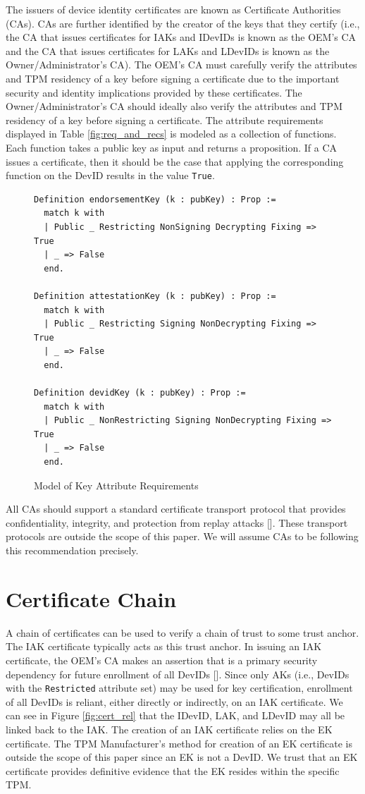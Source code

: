 The issuers of device identity certificates are known as Certificate Authorities (CAs). CAs are further identified by the creator of the keys that they certify (i.e., the CA that issues certificates for IAKs and IDevIDs is known as the OEM's CA and the CA that issues certificates for LAKs and LDevIDs is known as the Owner/Administrator's CA). The OEM's CA must carefully verify the attributes and TPM residency of a key before signing a certificate due to the important security and identity implications provided by these certificates. The Owner/Administrator's CA should ideally also verify the attributes and TPM residency of a key before signing a certificate. The attribute requirements displayed in Table \ref{fig:req_and_recs} is modeled as a collection of functions. Each function takes a public key as input and returns a proposition. If a CA issues a certificate, then it should be the case that applying the corresponding function on the DevID results in the value \verb|True|.
\begin{figure}[h]
\begin{lstlisting}[language=Coq]
Definition endorsementKey (k : pubKey) : Prop :=
  match k with
  | Public _ Restricting NonSigning Decrypting Fixing => True
  | _ => False
  end.

Definition attestationKey (k : pubKey) : Prop :=
  match k with
  | Public _ Restricting Signing NonDecrypting Fixing => True
  | _ => False
  end.

Definition devidKey (k : pubKey) : Prop :=
  match k with
  | Public _ NonRestricting Signing NonDecrypting Fixing => True
  | _ => False
  end.
\end{lstlisting}
\caption{Model of Key Attribute Requirements}
\end{figure}
All CAs should support a standard certificate transport protocol that provides confidentiality, integrity, and protection from replay attacks [\cite{DevIDSpec-TCG}]. These transport protocols are outside the scope of this paper. We will assume CAs to be following this recommendation precisely. 




\section{Certificate Chain}

A chain of certificates can be used to verify a chain of trust to some trust anchor. The IAK certificate typically acts as this trust anchor. In issuing an IAK certificate, the OEM's CA makes an assertion that is a primary security dependency for future enrollment of all DevIDs [\cite{DevIDSpec-TCG}]. Since only AKs (i.e., DevIDs with the \verb|Restricted| attribute set) may be used for key certification, enrollment of all DevIDs is reliant, either directly or indirectly, on an IAK certificate. We can see in Figure \ref{fig:cert_rel} that the IDevID, LAK, and LDevID may all be linked back to the IAK. The creation of an IAK certificate relies on the EK certificate. The TPM Manufacturer's method for creation of an EK certificate is outside the scope of this paper since an EK is not a DevID. We trust that an EK certificate provides definitive evidence that the EK resides within the specific TPM.


